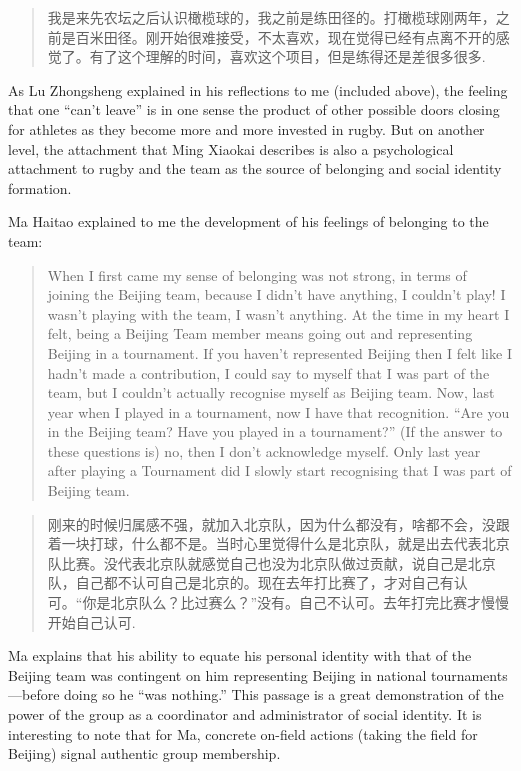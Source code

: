 \begin{CJK}{UTF8}{gbsn}
\begin{quotation}
    我是来先农坛之后认识橄榄球的，我之前是练田径的。打橄榄球刚两年，之前是百米田径。刚开始很难接受，不太喜欢，现在觉得已经有点离不开的感觉了。有了这个理解的时间，喜欢这个项目，但是练得还是差很多很多.
\end{quotation}

As Lu Zhongsheng explained in his reflections to me (included above), the feeling that one ``can't leave'' is in one sense the product of other possible doors closing for athletes as they become more and more invested in rugby.  But on another level, the attachment that Ming Xiaokai describes is also a psychological attachment to rugby and the team as the source of belonging and social identity formation.

Ma Haitao explained to me the development of his feelings of belonging to the team:

  \begin{quotation}
    When I first came my sense of belonging was not strong, in terms of joining the Beijing team, because I didn’t have anything, I couldn’t play! I wasn’t playing with the team, I wasn’t anything.  At the time in my heart I felt, being a Beijing Team member means going out and representing Beijing in a tournament.  If you haven’t represented Beijing then I felt like I hadn’t made a contribution, I could say to myself that I was part of the team, but I couldn’t actually recognise myself as Beijing team.  Now, last year when I played in a tournament, now I have that recognition. ``Are you in the Beijing team? Have you played in a tournament?'' (If the answer to these questions is) no, then I don’t acknowledge myself.  Only last year after playing a Tournament did I slowly start recognising that I was part of Beijing team.
  \end{quotation}

  \begin{quotation}
    刚来的时候归属感不强，就加入北京队，因为什么都没有，啥都不会，没跟着一块打球，什么都不是。当时心里觉得什么是北京队，就是出去代表北京队比赛。没代表北京队就感觉自己也没为北京队做过贡献，说自己是北京队，自己都不认可自己是北京的。现在去年打比赛了，才对自己有认可。“你是北京队么？比过赛么？”没有。自己不认可。去年打完比赛才慢慢开始自己认可.
  \end{quotation}

Ma explains that his ability to equate his personal identity with that of the Beijing team was contingent on him representing Beijing in national tournaments---before doing so he ``was nothing.''  This passage is a great demonstration of the power of the group as a coordinator and administrator of social identity.  It is interesting to note that for Ma, concrete on-field actions (taking the field for Beijing) signal authentic group membership.


\end{CJK}
